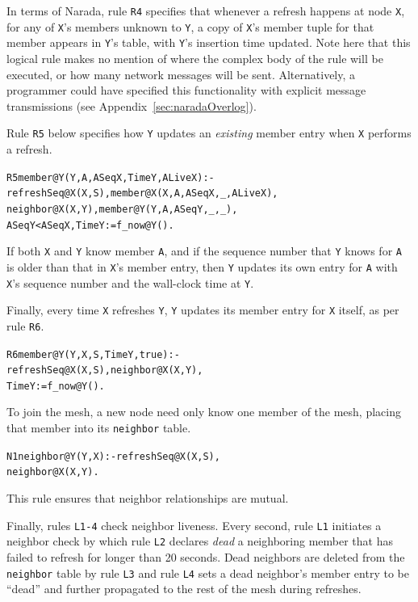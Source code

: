 \documentclass{sig-alt-full}
\newcommand{\ol}[1]{{\tt\footnotesize#1}}
\newenvironment{overlog}{\begin{alltt}\small}{\end{alltt}}
\begin{document}
In terms of Narada, rule \ol{R4} specifies that whenever a refresh
happens at node \ol{X}, for any of \ol{X}'s members unknown to \ol{Y},
a copy of \ol{X}'s member tuple for that member appears in \ol{Y}'s
table, with
\ol{Y}'s insertion time updated.  Note here
that this logical rule makes no mention of where the complex body of
the rule
will be executed, or how many network messages will be
sent. Alternatively, a programmer could have specified this
functionality with explicit message transmissions (see
Appendix~\ref{sec:naradaOverlog}).

Rule \ol{R5} below specifies how \ol{Y} updates an \emph{existing}
member entry when \ol{X} performs a refresh.

\begin{overlog}
R5 member@Y(Y, A, ASeqX, TimeY, ALiveX) :-
  refreshSeq@X(X, S), member@X(X, A, ASeqX, _, ALiveX), 
  neighbor@X(X, Y), member@Y(Y, A, ASeqY, _, _), 
  ASeqY < ASeqX, TimeY := f_now@Y().
\end{overlog}

\noindent{}If both \ol{X} and \ol{Y} know member \ol{A}, and if the
sequence number that \ol{Y} knows
for \ol{A} is older than that in \ol{X}'s member entry, 
then \ol{Y}
updates its own entry for \ol{A} with \ol{X}'s sequence number and the
wall-clock time at \ol{Y}.

Finally, every time \ol{X} refreshes \ol{Y}, \ol{Y} updates its member
entry for \ol{X} itself, as per rule \ol{R6}.

\begin{overlog}
R6 member@Y(Y, X, S, TimeY, true) :-
  refreshSeq@X(X, S), neighbor@X(X, Y),
  TimeY := f_now@Y().
\end{overlog}

\noindent{}To join the mesh, a new node need only know one member of the
mesh, placing that member into its \ol{neighbor} table.

\begin{overlog}
N1 neighbor@Y(Y, X) :- refreshSeq@X(X, S),
  neighbor@X(X, Y).
\end{overlog}

\noindent{}This rule ensures that neighbor relationships are mutual.

Finally, rules \ol{L1-4} check neighbor liveness. Every second, rule
\ol{L1} initiates a neighbor check by which rule \ol{L2} declares
\emph{dead} a
neighboring member that has failed to refresh
for longer than 20 seconds. Dead neighbors are deleted from the
\ol{neighbor} table by rule \ol{L3} and rule \ol{L4} sets a dead
neighbor's member entry to be ``dead'' and further propagated to the
rest of the mesh during refreshes.
\end{document}
